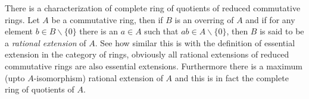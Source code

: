 \documentclass[12pt]{article}
\begin{document}
There is a characterization of complete ring of quotients of reduced commutative rings. Let $A$ be a  commutative ring, then if $B$ is an overring of $A$ and if for any element $b\in B\backslash\{0\}$ there is an $a\in A$ such that $ab\in A\backslash\{0\}$, then $B$ is said to be a \emph{rational extension} of $A$. See how similar this is with the definition of essential extension in the category of rings, obviously all rational extensions of reduced commutative rings are also essential extensions. Furthermore there is a maximum (upto $A$-isomorphism) rational extension of $A$ and this is in fact the complete ring of quotients of $A$.
\end{document}
